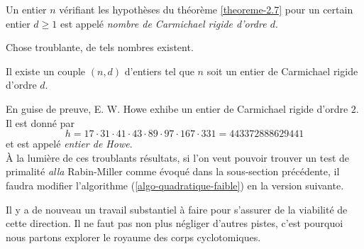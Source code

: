 \begin{definition}
	Un entier $n$ vérifiant les hypothèses du théorème \ref{theoreme-2.7} pour un certain entier $d\geq 1$ est appelé \emph{nombre de Carmichael rigide d'ordre $d$}.
\end{definition}

Chose troublante, de tels nombres existent.

\begin{theoreme}[Howe, 2000]
	Il existe un couple $(n, d)$ d'entiers tel que $n$ soit un entier de Carmichael rigide d'ordre $d$.
\end{theoreme}

En guise de preuve, E. W. Howe exhibe un entier de Carmichael rigide d'ordre $2$. Il est donné par 
	\begin{equation}\label{Howe}
		h = 17 \cdot 31 \cdot 41 \cdot 43 \cdot 89 \cdot 97 \cdot 167 \cdot 331 = 443372888629441
	\end{equation}
et est appelé \emph{entier de Howe}. \\

À la lumière de ces troublants résultats, si l'on veut pouvoir trouver un test de primalité \emph{alla} Rabin-Miller comme évoqué dans la sous-section précédente, il faudra modifier l'algorithme (\ref{algo-quadratique-faible}) en la version suivante.


\vspace{1em}
\begin{algorithm}[H]\label{algo-quadratique-faible}
\end{algorithm}
\vspace{1em}

Il y a de nouveau un travail substantiel à faire pour s'assurer de la viabilité de cette direction. Il ne faut pas non plus négliger d'autres pistes, c'est pourquoi nous partons explorer le royaume des corps cyclotomiques.
